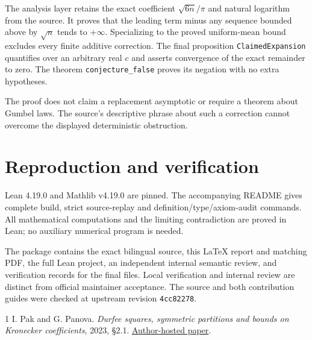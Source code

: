 \documentclass[10pt]{article}
\begin{document}
The analysis layer retains the exact coefficient $\sqrt{6n}/\pi$ and natural logarithm from the source. It proves that the leading term minus any sequence bounded above by $\sqrt n$ tends to $+\infty$. Specializing to the proved uniform-mean bound excludes every finite additive correction. The final proposition \texttt{ClaimedExpansion} quantifies over an arbitrary real $c$ and asserts convergence of the exact remainder to zero. The theorem \texttt{conjecture\_false} proves its negation with no extra hypotheses.

The proof does not claim a replacement asymptotic or require a theorem about Gumbel laws. The source's descriptive phrase about such a correction cannot overcome the displayed deterministic obstruction.

\section{Reproduction and verification}
Lean 4.19.0 and Mathlib v4.19.0 are pinned. The accompanying README gives complete build, strict source-replay and definition/type/axiom-audit commands. All mathematical computations and the limiting contradiction are proved in Lean; no auxiliary numerical program is needed.

The package contains the exact bilingual source, this LaTeX report and matching PDF, the full Lean project, an independent internal semantic review, and verification records for the final files. Local verification and internal review are distinct from official maintainer acceptance. The source and both contribution guides were checked at upstream revision \texttt{4cc82278}.

\begin{thebibliography}{1}\small
{} I. Pak and G. Panova. \emph{Durfee squares, symmetric partitions and bounds on Kronecker coefficients}, 2023, \S2.1. \href{https://www.math.ucla.edu/~pak/papers/Fixed12.pdf}{Author-hosted paper}.
\end{thebibliography}
\end{document}
